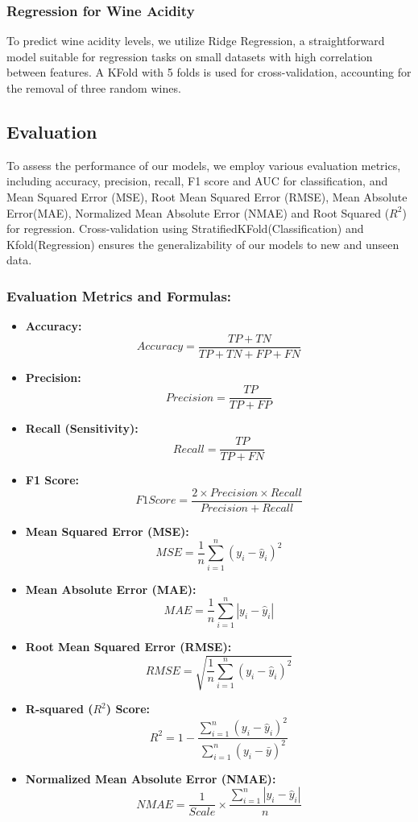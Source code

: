 \documentclass[twocolumn]{article}
\begin{document}
	\subsubsection{Regression for Wine Acidity}
	To predict wine acidity levels, we utilize Ridge Regression, a straightforward
	model suitable for regression tasks on small datasets with high correlation between features. A KFold with 5 folds is
	used for cross-validation, accounting for the removal of three random wines.

	\subsection{Evaluation}
	To assess the performance of our models, we employ various evaluation metrics,
	including accuracy, precision, recall, F1 score and AUC for classification, and
	Mean Squared Error (MSE), Root Mean Squared Error (RMSE), Mean Absolute Error(MAE),
	Normalized Mean Absolute Error (NMAE) and Root Squared ($R^{2}$) for regression.
	Cross-validation using StratifiedKFold(Classification) and Kfold(Regression)
	ensures the generalizability of our models to new and unseen data.

	\subsubsection{Evaluation Metrics and Formulas:}

	\begin{itemize}
		\item \textbf{Accuracy:}
			\[
				Accuracy = \frac{TP + TN}{TP + TN + FP + FN}
			\]

		\item \textbf{Precision:}
			\[
				Precision = \frac{TP}{TP + FP}
			\]

		\item \textbf{Recall (Sensitivity):}
			\[
				Recall = \frac{TP}{TP + FN}
			\]

		\item \textbf{F1 Score:}
			\[
				F1 Score = \frac{2 \times Precision \times Recall}{Precision + Recall}
			\]

		\item \textbf{Mean Squared Error (MSE):}
			\[
				MSE = \frac{1}{n}\sum_{i=1}^{n}(y_{i}- \hat{y}_{i})^{2}
			\]

		\item \textbf{Mean Absolute Error (MAE):}
			\[
				MAE = \frac{1}{n}\sum_{i=1}^{n}|y_{i}- \hat{y}_{i}|
			\]

		\item \textbf{Root Mean Squared Error (RMSE):}
			\[
				RMSE = \sqrt{\frac{1}{n}\sum_{i=1}^{n}(y_{i}- \hat{y}_{i})^{2}}
			\]

		\item \textbf{R-squared ($R^{2}$) Score:}
			\[
				R^{2}= 1 - \frac{\sum_{i=1}^{n}(y_{i}- \hat{y}_{i})^{2}}{\sum_{i=1}^{n}(y_{i}-
				\bar{y})^{2}}
			\]

		\item \textbf{Normalized Mean Absolute Error (NMAE):}
			\[
				NMAE = \frac{1}{Scale}\times \frac{\sum_{i=1}^{n}|y_{i}- \hat{y}_{i}|}{n}
			\]
	\end{itemize}
\end{document}
